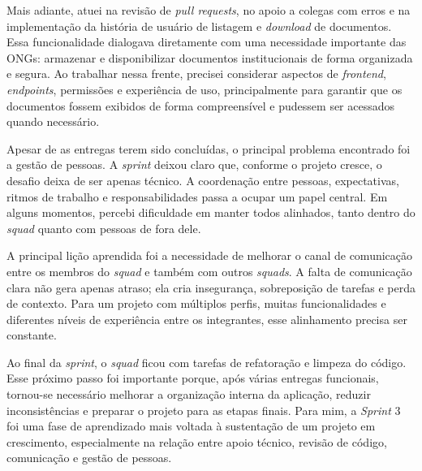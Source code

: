 Mais adiante, atuei na revisão de \textit{pull requests}, no apoio a colegas com erros e na implementação da história de usuário de listagem e \textit{download} de documentos. Essa funcionalidade dialogava diretamente com uma necessidade importante das \ac{ONGs}: armazenar e disponibilizar documentos institucionais de forma organizada e segura. Ao trabalhar nessa frente, precisei considerar aspectos de \textit{frontend}, \textit{endpoints}, permissões e experiência de uso, principalmente para garantir que os documentos fossem exibidos de forma compreensível e pudessem ser acessados quando necessário.

Apesar de as entregas terem sido concluídas, o principal problema encontrado foi a gestão de pessoas. A \textit{sprint} deixou claro que, conforme o projeto cresce, o desafio deixa de ser apenas técnico. A coordenação entre pessoas, expectativas, ritmos de trabalho e responsabilidades passa a ocupar um papel central. Em alguns momentos, percebi dificuldade em manter todos alinhados, tanto dentro do \textit{squad} quanto com pessoas de fora dele.

A principal lição aprendida foi a necessidade de melhorar o canal de comunicação entre os membros do \textit{squad} e também com outros \textit{squads}. A falta de comunicação clara não gera apenas atraso; ela cria insegurança, sobreposição de tarefas e perda de contexto. Para um projeto com múltiplos perfis, muitas funcionalidades e diferentes níveis de experiência entre os integrantes, esse alinhamento precisa ser constante.

Ao final da \textit{sprint}, o \textit{squad} ficou com tarefas de refatoração e limpeza do código. Esse próximo passo foi importante porque, após várias entregas funcionais, tornou-se necessário melhorar a organização interna da aplicação, reduzir inconsistências e preparar o projeto para as etapas finais. Para mim, a \textit{Sprint} 3 foi uma fase de aprendizado mais voltada à sustentação de um projeto em crescimento, especialmente na relação entre apoio técnico, revisão de código, comunicação e gestão de pessoas.
